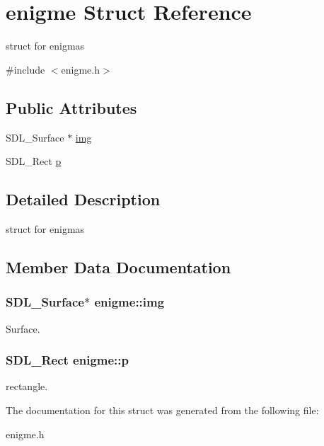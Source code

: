 \hypertarget{structenigme}{}\section{enigme Struct Reference}
\label{structenigme}


struct for enigmas  




{\ttfamily \#include $<$enigme.\+h$>$}

\subsection*{Public Attributes}
\begin{DoxyCompactItemize}
\item 
S\+D\+L\+\_\+\+Surface $\ast$ \hyperlink{structenigme_ac5c2141e5f8c366ff16d1fad83ee3e54}{img}
\item 
S\+D\+L\+\_\+\+Rect \hyperlink{structenigme_a1ecc3fa572d2c308e1aecacf74fd1ec0}{p}
\end{DoxyCompactItemize}


\subsection{Detailed Description}
struct for enigmas 

\subsection{Member Data Documentation}
\subsubsection[{\texorpdfstring{img}{img}}]{\setlength{\rightskip}{0pt plus 5cm}S\+D\+L\+\_\+\+Surface$\ast$ enigme\+::img}\hypertarget{structenigme_ac5c2141e5f8c366ff16d1fad83ee3e54}{}\label{structenigme_ac5c2141e5f8c366ff16d1fad83ee3e54}
Surface. 
\subsubsection[{\texorpdfstring{p}{p}}]{\setlength{\rightskip}{0pt plus 5cm}S\+D\+L\+\_\+\+Rect enigme\+::p}\hypertarget{structenigme_a1ecc3fa572d2c308e1aecacf74fd1ec0}{}\label{structenigme_a1ecc3fa572d2c308e1aecacf74fd1ec0}
rectangle. 

The documentation for this struct was generated from the following file\+:\begin{DoxyCompactItemize}
\item 
enigme.\+h\end{DoxyCompactItemize}
